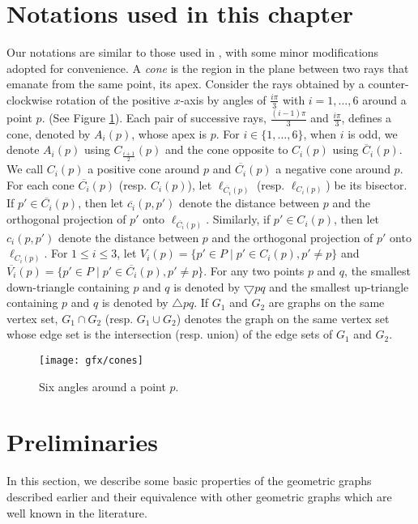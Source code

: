 \section{Notations used in this chapter}
Our notations are similar to those used in \cite{Bonichon2010}, with some minor modifications adopted for convenience. 
A {\em cone} is the region in the plane between two rays that emanate from the same point, its apex. 
Consider the rays obtained by a counter-clockwise rotation of the positive $x$-axis by angles of $\frac{i\pi}{3}$ with $i=1, \dots, 6$ 
around a point $p$. (See Figure \ref{Figcones}). 
Each pair of successive rays, $\frac{(i-1)\pi}{3}$ and $\frac{i\pi}{3}$, defines a cone, denoted by $A_i(p)$, whose apex is $p$. 
For $i \in \{1, \ldots, 6\}$, when $i$ is odd, we denote $A_i(p)$ using $C_{\frac{i+1}{2}}(p)$ and the cone opposite to $C_i(p)$ using 
$\overline{C}_i(p)$. We call $C_i(p)$ a positive cone around $p$ and $\overline{C_i}(p)$ a negative cone around $p$. For each cone $\overline{C_i}(p)$ 
(resp. $C_i(p)$), let $\ell_{\overline{C_i}(p)}$ (resp. $\ell_{{C_i}(p)}$) be its bisector. If $p' \in \overline{C_i}(p)$, 
then let $\overline{c_i}(p, p')$ denote the distance between $p$ and the orthogonal projection of $p'$ onto $\ell_{\overline{C_i}(p)}$. 
Similarly, if $p' \in C_i(p)$, then let ${c_i}(p, p')$ denote the distance between $p$ and the orthogonal projection of $p'$ 
onto $\ell_{C_i(p)}$. 
For $1 \le i \le 3$, let $V_i(p) = \{p' \in P \mid p' \in C_i(p), p' \ne p \}$ and 
$\overline{V_i}(p) = \{p' \in P \mid p' \in \overline{C_i}(p), p' \ne p \}$. For any two points $p$ and $q$, the smallest down-triangle 
containing $p$ and $q$ is denoted by $\bigtriangledown pq$ and the smallest up-triangle containing $p$ and $q$ is denoted by $\bigtriangleup pq$. 
If $G_1$ and $G_2$ are graphs on the same vertex set, $G_1 \cap G_2$ (resp. $G_1 \cup G_2$) denotes the graph on the same vertex set whose edge set 
is the intersection (resp. union) of the edge sets of $G_1$ and $G_2$.
\begin{figure}[h]
\centering
  \texttt{[image: gfx/cones]}   %
  \caption{Six angles around a point $p$.}
\label{Figcones}
  \end{figure}
\section{Preliminaries}\label{prelims}
In this section, we describe some basic properties of the geometric graphs described earlier and their equivalence with other geometric graphs which 
are well known in the literature. 

